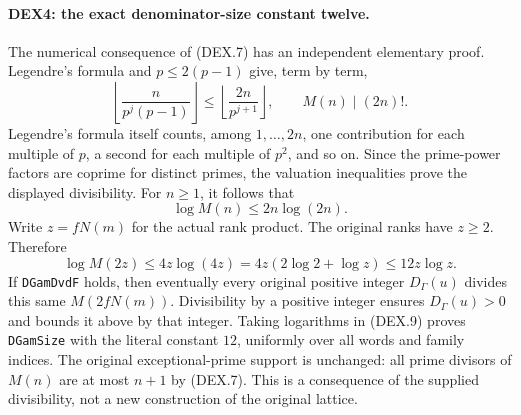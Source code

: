 \paragraph{DEX4: the exact denominator-size constant twelve.}
\label{claim:DEX4}
The numerical consequence of (DEX.7) has an independent elementary
proof. Legendre's formula and $p\le2(p-1)$ give, term by term,
\[
 \left\lfloor\frac{n}{p^j(p-1)}\right\rfloor
 \le \left\lfloor\frac{2n}{p^{j+1}}\right\rfloor,
 \qquad M(n)\mid(2n)! .                                 \tag{DEX.8}
\]
Legendre's formula itself counts, among $1,\ldots,2n$, one contribution
for each multiple of $p$, a second for each multiple of $p^2$, and so
on. Since the prime-power factors are coprime for distinct primes,
the valuation inequalities prove the displayed divisibility. For
$n\ge1$, it follows that
\[
                       \log M(n)\le2n\log(2n).
\]
Write $z=fN(m)$ for the actual rank product. The original ranks have
$z\ge2$. Therefore
\[
 \log M(2z)\le4z\log(4z)
       =4z(2\log2+\log z)\le12z\log z.                 \tag{DEX.9}
\]
If \texttt{DGamDvdF} holds, then eventually every original positive
integer $D_\Gamma(u)$ divides this same $M(2fN(m))$. Divisibility by
a positive integer ensures $D_\Gamma(u)>0$ and bounds it above by that
integer. Taking logarithms in (DEX.9) proves \texttt{DGamSize} with
the literal constant $12$, uniformly over all words and family indices.
The original exceptional-prime support is unchanged: all prime divisors
of $M(n)$ are at most $n+1$ by (DEX.7). This is a consequence of the
supplied divisibility, not a new construction of the original lattice.

